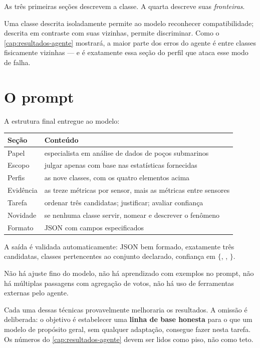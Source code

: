 \begin{destaque}
As três primeiras seções descrevem a classe. A quarta descreve suas \emph{fronteiras}.

Uma classe descrita isoladamente permite ao modelo reconhecer compatibilidade; descrita
em contraste com suas vizinhas, permite discriminar. Como o \cref{cap:resultados-agente}
mostrará, a maior parte dos erros do agente é entre classes fisicamente vizinhas --- e é
exatamente essa seção do perfil que ataca esse modo de falha.
\end{destaque}

\section{O prompt}

A estrutura final entregue ao modelo:

\begin{center}
\small
\begin{tabular}{ll}
\toprule
\textbf{Seção} & \textbf{Conteúdo} \\
\midrule
Papel        & especialista em análise de dados de poços submarinos \\
Escopo       & julgar apenas com base nas estatísticas fornecidas \\
Perfis       & as nove classes, com os quatro elementos acima \\
Evidência    & as treze métricas por sensor, mais as métricas entre sensores \\
Tarefa       & ordenar três candidatas; justificar; avaliar confiança \\
Novidade     & se nenhuma classe servir, nomear e descrever o fenômeno \\
Formato      & JSON com campos especificados \\
\bottomrule
\end{tabular}
\end{center}

A saída é validada automaticamente: JSON bem formado, exatamente três candidatas, classes
pertencentes ao conjunto declarado, confiança em $\{$, ,
$\}$.

\begin{destaque}
Não há ajuste fino do modelo, não há aprendizado com exemplos no prompt, não há múltiplas
passagens com agregação de votos, não há uso de ferramentas externas pelo agente.

Cada uma dessas técnicas provavelmente melhoraria os resultados. A omissão é deliberada:
o objetivo é estabelecer uma \textbf{linha de base honesta} para o que um modelo de
propósito geral, sem qualquer adaptação, consegue fazer nesta tarefa. Os números do
\cref{cap:resultados-agente} devem ser lidos como piso, não como teto.
\end{destaque}


